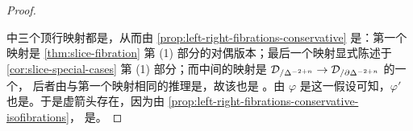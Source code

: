\begin{proof}
\begin{center}
\end{center}
中三个顶行映射都是\trRightFibration{}，从而由%
\cref{prop:left-right-fibrations-conservative} 是\trConservative{}：第一个映射是%
\cref{thm:slice-fibration} 第 (1) 部分的对偶版本；最后一个映射显式陈述于
\cref{cor:slice-special-cases} 第 (1) 部分；而中间的映射是
$\mathcal{D}_{/\Delta^{-2+n}} \to \mathcal{D}_{/\partial\Delta^{-2+n}}$ 的一个\trPullback{}，
后者由与第一个映射相同的推理是\trRightFibration{}，故该\trPullback{}也是%
\trRightFibration{}。由 $\varphi$ 是\trEquivalence{}这一假设可知，$\varphi'$
也是\trEquivalence{}。于是虚箭头存在，因为由%
\cref{prop:left-right-fibrations-conservative-isofibrations}，
\trRightFibration{}是\trIsofibration{}。
\end{proof}

